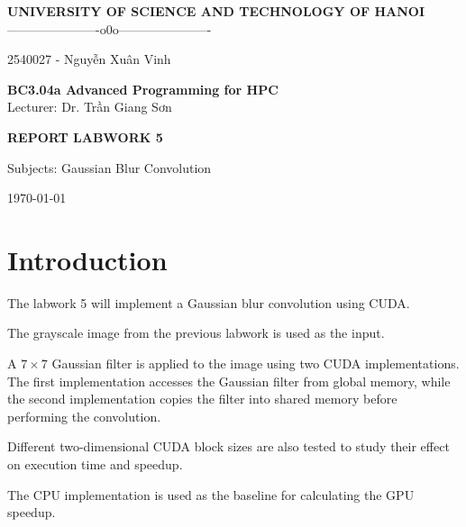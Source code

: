 \documentclass[11pt]{article}
\begin{document}
\begin{center}

{\Large \textbf{UNIVERSITY OF SCIENCE AND TECHNOLOGY OF HANOI}}\\
\vspace{0.3cm}
----------------------o0o----------------------\\

\vspace{4cm}

{\large
\centerline{2540027 - Nguyễn Xuân Vinh}
}

\vspace{4cm}

{\Huge \textbf{BC3.04a Advanced Programming for HPC}}\\
\vspace{0.5cm}
Lecturer: Dr. Trần Giang Sơn

\vspace{4cm}

{\Large \textbf{REPORT LABWORK 5}}\\

\vspace{0.5cm}

{\large
Subjects: Gaussian Blur Convolution
}

\vspace{4cm}
\today
\end{center}

\newpage

\newpage

\tableofcontents

\newpage

\section{Introduction}

The labwork 5 will implement a Gaussian blur convolution using CUDA.

The grayscale image from the previous labwork is used as the input.

A $7\times7$ Gaussian filter is applied to the image using two CUDA
implementations. The first implementation accesses the Gaussian filter
from global memory, while the second implementation copies the filter
into shared memory before performing the convolution.

Different two-dimensional CUDA block sizes are also tested to study
their effect on execution time and speedup.

The CPU implementation is used as the baseline for calculating the
GPU speedup.
\end{document}
